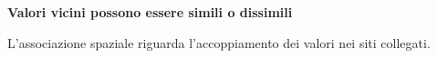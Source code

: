 \documentclass[12pt,aspectratio=1610]{beamer}
\begin{document}
\begin{frame}[plain]\hypertarget{slide56}{}
\begin{lrbox}{\TitleBox}
\begin{minipage}[t]{17.7cm}\raggedright\color{Ink}\fontsize{11.3}{14.8}\selectfont
\color{Navy}\bfseries\fontsize{20.6}{24.5}\selectfont Valori vicini possono essere simili o dissimili
\end{minipage}\end{lrbox}

\begin{lrbox}{\RecallBox}
\begin{minipage}[t]{14.3cm}\raggedright\color{Ink}\fontsize{11.3}{14.8}\selectfont
\fontsize{10.3}{13.8}\selectfont L’associazione spaziale riguarda l’accoppiamento dei valori nei siti collegati.
\end{minipage}\end{lrbox}


\end{frame}
\end{document}
